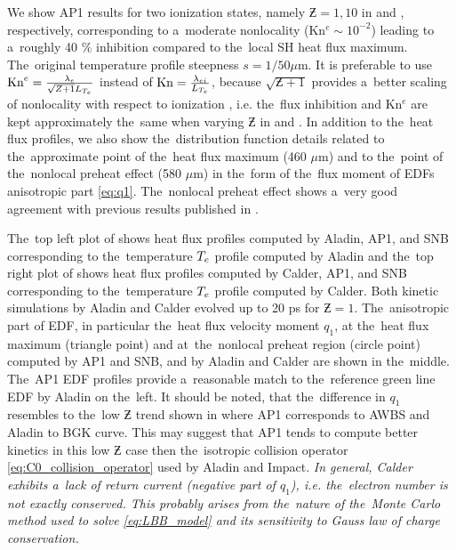 We show AP1 results for two ionization states, namely $\Zbar= 1, 10$ 
in  and , 
respectively, corresponding to a~moderate nonlocality 
(Kn$^e \sim 10^{-2}$) leading to a~roughly 40 $\%$ inhibition compared 
to the~local SH heat flux maximum. The~original temperature profile steepness
$s = 1/50 \mu$m.
It is preferable to use 
$\text{Kn}^e = \frac{\lambda_e}{\sqrt{Z + 1}L_{T_e}}$ instead of
 $\text{Kn} = \frac{\lambda_{ei}}{L_{T_e}}$, because $\sqrt{\Zbar + 1}$ provides 
a~better scaling of nonlocality with respect
to ionization \cite{LMV_1983_7}, i.e. the~flux inhibition and Kn$^e$ are
kept approximately the~same when varying $\Zbar$ in 
 and .
In addition to the~heat flux profiles, we also show the~distribution function 
details related to the~approximate point of the~heat flux maximum (460 $\mu$m) 
and to the~point of the~nonlocal preheat effect (580 $\mu$m) in the~form of
the~flux moment of EDFs anisotropic part \eqref{eq:q1}.
The~nonlocal preheat effect shows a~very good agreement with 
previous results published in \cite{Sherlock_PoP2017}.

The~top left plot of  shows heat flux 
profiles computed by Aladin, AP1, and SNB corresponding to the~temperature 
$T_e$ profile computed by Aladin and the~top right plot of 
 shows heat flux profiles computed by Calder, 
AP1, and SNB corresponding to the~temperature $T_e$ profile computed by Calder.
Both kinetic simulations by Aladin and Calder evolved up to 20 ps for 
$\Zbar = 1$. 
The~anisotropic part of EDF, in particular the~heat flux velocity moment $q_1$, 
at the~heat flux maximum (triangle point) and at~the~nonlocal preheat region 
(circle point) computed by AP1 and SNB, and by Aladin and Calder are shown 
in the~middle. %
The~AP1 EDF profiles provide a~reasonable match to 
the~reference green line EDF by Aladin on the~left. It should be noted, 
that the~difference in $q_1$ resembles to the~low $\Zbar$ trend
shown in  where AP1 corresponds to AWBS and Aladin to
BGK curve. This may suggest that AP1 tends 
to compute better kinetics in this low $\Zbar$ case then 
the~isotropic collision operator
\eqref{eq:C0_collision_operator} used by Aladin and Impact.
\textit{In general, Calder exhibits a~lack of 
return current (negative part of $q_1$), i.e. the~electron number is not 
exactly conserved. This probably arises from the~nature of the~Monte Carlo 
method used to solve \eqref{eq:LBB_model} and its sensitivity to Gauss law
of charge conservation.}

